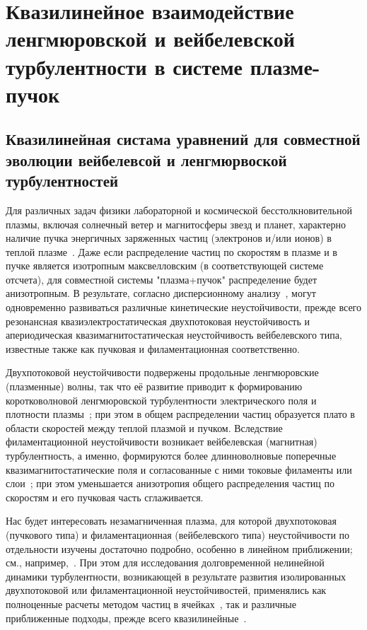 \chapter{Квазилинейное взаимодействие ленгмюровской и вейбелевской турбулентности в системе плазме-пучок}
\label{ch:ch3}
\section{Квазилинейная систама уравнений для совместной эволюции вейбелевсой и ленгмюрвоской турбулентностей}

Для различных задач физики лабораторной и космической бесстолкновительной плазмы, включая солнечный ветер и магнитосферы звезд и планет, характерно наличие пучка энергичных заряженных частиц (электронов и/или ионов) в теплой плазме~\cite{Gary1993,Treumann1997,Marsch2006}. Даже если распределение частиц по скоростям в плазме и в пучке является изотропным максвелловским (в соответствующей  системе отсчета), для совместной системы "плазма+пучок" распределение будет анизотропным.  В результате, согласно дисперсионному анализу~\cite{Mikhailovsky1971,Fried1959,Krall1973,Tzoufras2006,Bret2010}, могут одновременно развиваться различные кинетические неустойчивости, прежде всего резонансная квазиэлектростатическая двухпотоковая неустойчивость и апериодическая квазимагнитостатическая неустойчивость вейбелевского типа, известные также как пучковая и филаментационная соответственно. 

Двухпотоковой неустойчивости подвержены продольные ленгмюровские (плазменные) волны, так что её развитие приводит к формированию коротковолновой ленгмюровской турбулентности электрического поля и плотности плазмы~\cite{Vedenov1963,Zakharov1972,VedenovRyutov1975,Krall1973,Appert1976,Yi2010,Bakunin2017,Sun2022}; при этом в общем распределении частиц образуется плато в области  скоростей между теплой плазмой и пучком.  Вследствие филаментационной неустойчивости возникает вейбелевская (магнитная) турбулентность, а именно, формируются более длинноволновые поперечные квазимагнитостатические поля и согласованные с ними токовые филаменты или слои~\cite{Weibel1959, Zhou2022,Fried1959, Kalman1968, Morse1971, Kocharovsky2016, Lazar2006, Stockem2009, SchaeferRolffs2006}; при этом уменьшается анизотропия общего распределения частиц по скоростям и его пучковая часть сглаживается.


Нас будет интересовать незамагниченная плазма, для которой двухпотоковая (пучкового типа) и филаментационная (вейбелевского типа) неустойчивости по отдельности изучены достаточно подробно, особенно в линейном приближении; см., например,~\cite{Mikhailovsky1971,Fried1959,Tzoufras2006,Hao2008,Bret2010,Moya2022}. При этом для исследования долговременной нелинейной динамики турбулентности, возникающей в результате развития изолированных двухпотоковой или филаментационной неустойчивостей, применялись как  полноценные расчеты методом частиц в ячейках~\cite{Kasaba2001,Dum1994,Yi2010,Ruyer2015,Dieckmann2009,Bret2010,Lazar2023,Nechaev2023,Kocharovsky2024,Garasev2022,Kuznetsov2025a}, так и различные приближенные подходы, прежде всего квазилинейные~\cite{Vedenov1963,VedenovRyutov1975,Appert1976,Bakunin2017,Ziebell2008,Lemons1979,Davidson1972,Ruyer2015,Kuznetsov2022,Kuznetsov2023}. 

